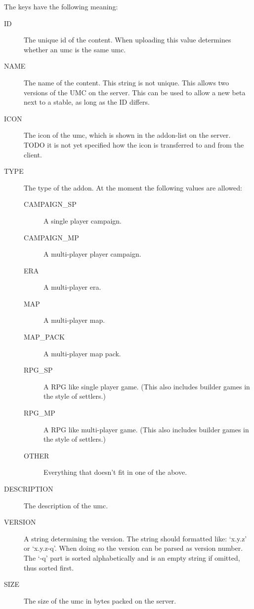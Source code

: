 The keys have the following meaning:
\begin{description}
\item[ID]
	The unique id of the content. When uploading this value determines
	whether an umc is the same umc.

\item[NAME]
	The name of the content. This string is not unique. This allows two
	versions of the UMC on the server. This can be used to allow a new beta
	next to a stable, as long as the ID differs.

\item[ICON]
	The icon of the umc, which is shown in the addon-list on the server.
	TODO it is not yet specified how the icon is transferred to and from the
	client.

\item[TYPE]
	The type of the addon. At the moment the following values are allowed:
	\begin{description}
	\item[CAMPAIGN\_SP] A single player campaign.
	\item[CAMPAIGN\_MP] A multi-player player campaign.
	\item[ERA] A multi-player era.
	\item[MAP] A multi-player map.
	\item[MAP\_PACK] A multi-player map pack.
	\item[RPG\_SP]
		A RPG like single player game. (This also includes builder games in
		the style of settlers.)
 
	\item[RPG\_MP]
		A RPG like multi-player game. (This also includes builder games in
		the style of settlers.)
 
	\item[OTHER] Everything that doesn't fit in one of the above.
	\end{description}

\item[DESCRIPTION]
	The description of the umc.

\item[VERSION]
	A string determining the version. The string should formatted like:
	`x.y.z' or `x.y.z-q'. When doing so the version can be parsed as version
	number. The `-q' part is sorted alphabetically and is an empty string if
	omitted, thus sorted first.

\item[SIZE]
	The size of the umc in bytes packed on the server.


\end{description}
